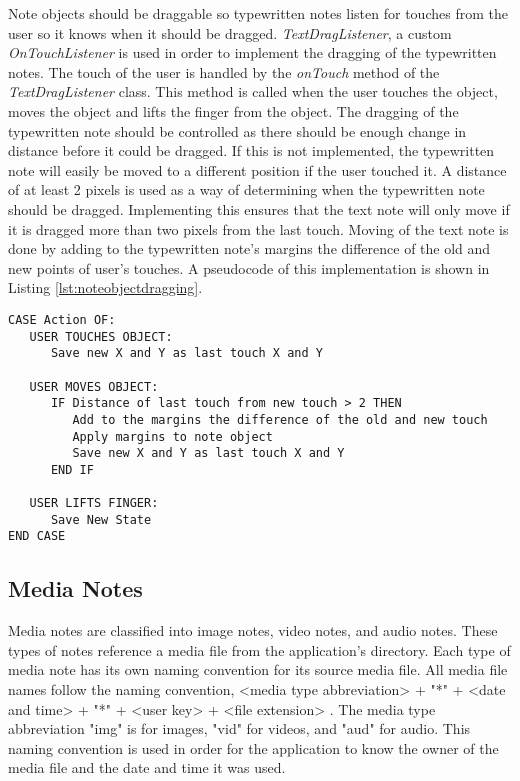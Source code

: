 	Note objects should be draggable so typewritten notes listen for touches from the user so it knows when it should be dragged. \textit{TextDragListener}, a custom \textit{OnTouchListener} is used in order to implement the dragging of the typewritten notes. The touch of the user is handled by the \textit{onTouch} method of the \textit{TextDragListener} class. This method is called when the user touches the object, moves the object and lifts the finger from the object. The dragging of the typewritten note should be controlled as there should be enough change in distance before it could be dragged. If this is not implemented, the typewritten note will easily be moved to a different position if the user touched it. A distance of at least 2 pixels is used as a way of determining when the typewritten note should be dragged. Implementing this ensures that the text note will only move if it is dragged more than two pixels from the last touch. Moving of the text note is done by adding to the typewritten note's margins the difference of the old and new points of user's touches. A pseudocode of this implementation is shown in Listing \ref{lst:noteobjectdragging}.

\begin{lstlisting}[frame=single, label=lst:noteobjectdragging, caption=Pseudocode for Note Object Dragging]
CASE Action OF:
   USER TOUCHES OBJECT:
      Save new X and Y as last touch X and Y
   
   USER MOVES OBJECT:	
      IF Distance of last touch from new touch > 2 THEN
	     Add to the margins the difference of the old and new touch
	     Apply margins to note object
	     Save new X and Y as last touch X and Y
	  END IF
	  
   USER LIFTS FINGER:
      Save New State
END CASE
\end{lstlisting}

\subsection{Media Notes}
\label{sec:medianotes}

Media notes are classified into image notes, video notes, and audio notes. These types of notes reference a media file from the application's directory. Each type of media note has its own naming convention for its source media file. All media file names follow the naming convention,  <media type abbreviation> + "*" + <date and time> + "*" + <user key> + <file extension> . The media type abbreviation "img" is for images, "vid" for videos, and "aud" for audio. This naming convention is used in order for the application to know the owner of the media file and the date and time it was used. 

